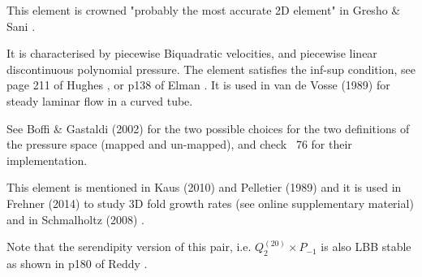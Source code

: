 
\noindent
\begin{minipage}{0.58\textwidth}


This element is crowned "probably the most accurate 2D element" 
in Gresho \& Sani \cite{grsa}.

It is characterised by piecewise Biquadratic velocities, 
and piecewise linear discontinuous polynomial pressure. 
The element satisfies the inf-sup condition, see page 211 of Hughes \cite{hugh}, or 
p138 of Elman \etal \cite{elsw}.
It is used in van de Vosse \etal (1989) \cite{vavs89} for steady laminar flow in a curved tube. 

See Boffi \& Gastaldi (2002) \cite{boga02} 
for the two possible choices for the two definitions of the pressure space (mapped and un-mapped), 
and check \stone~76 for their implementation.

This element is mentioned in Kaus (2010) \cite{kaus10} and Pelletier \etal (1989) \cite{pefc89} 
and it is  used in Frehner (2014) \cite{freh14} to study 3D fold growth rates 
(see online supplementary material) and in Schmalholtz (2008) \cite{schm08}.

Note that the serendipity version of this pair, i.e. $Q_2^{(20)}\times P_{-1}$ is also LBB stable
as shown in p180 of Reddy \cite{reddybook2}.

\end{minipage}
\hfill
\begin{minipage}{0.38\textwidth}
\begin{center}

\end{center}
\end{minipage}


